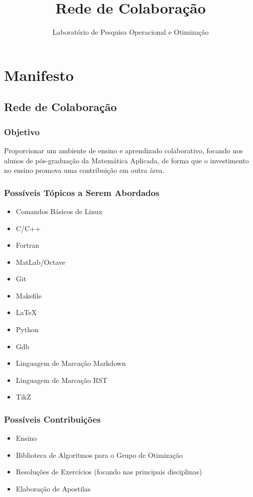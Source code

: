 \documentclass[a4paper,11pt]{report}
\title{ Rede de Colaboração }
\author{ Laboratório de Pesquisa Operacional e Otimização }
\date{ }
\numberwithin{equation}{section}
\begin{document}
\maketitle

\chapter{Manifesto}

\section{ Rede de Colaboração }

\subsection{ Objetivo }

Proporcionar um ambiente de ensino e aprendizado colaborativo, focando 
nos alunos de pós-graduação da Matemática Aplicada, de forma que o 
investimento no ensino promova uma contribuição em outra área.

\subsection{ Possíveis Tópicos a Serem Abordados }

\begin{itemize}
  \item Comandos Básicos de Linux
  \item C/C++
  \item Fortran
  \item MatLab/Octave
  \item Git
  \item Makefile
  \item LaTeX
  \item Python
  \item Gdb
  \item Linguagem de Marcação Markdown
  \item Linguagem de Marcação RST
  \item TikZ
\end{itemize}

\subsection{ Possíveis Contribuições }

\begin{itemize}
  \item Ensino
  \item Biblioteca de Algoritmos para o Grupo de Otimização
  \item Resoluções de Exercícios (focando nas principais disciplinas)
  \item Elaboração de Apostilas
\end{itemize}
\end{document}

